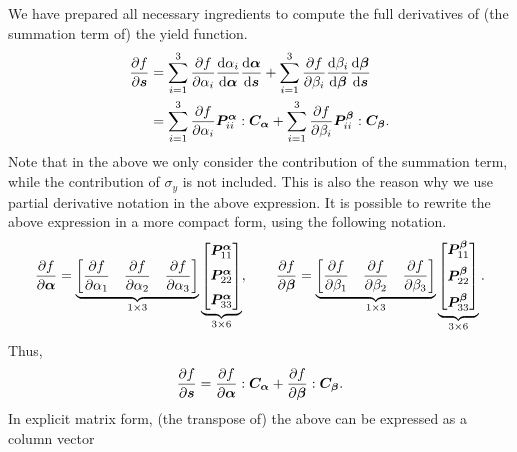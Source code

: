 We have prepared all necessary ingredients to compute the full derivatives of (the summation term of) the yield function.
\begin{gather}
    \begin{split}
        \dfrac{\partial{f}}{\partial{\bm{s}}} & =\sum_{i=1}^{3}\dfrac{\partial{f}}{\partial{\alpha_i}}\dfrac{\mathrm{d}\alpha_i}{\mathrm{d}\bm{\alpha}}\dfrac{\mathrm{d}\bm{\alpha}}{\mathrm{d}\bm{s}}+\sum_{i=1}^{3}\dfrac{\partial{f}}{\partial{\beta_i}}\dfrac{\mathrm{d}\beta_i}{\mathrm{d}\bm{\beta}}\dfrac{\mathrm{d}\bm{\beta}}{\mathrm{d}\bm{s}} \\
                        & =\sum_{i=1}^{3}\dfrac{\partial{f}}{\partial{\alpha_i}}\bm{P}_{ii}^{\bm{\alpha}}:\bm{C}_{\bm{\alpha}}+\sum_{i=1}^{3}\dfrac{\partial{f}}{\partial{\beta_i}}\bm{P}_{ii}^{\bm{\beta}}:\bm{C}_{\bm{\beta}}.
    \end{split}
\end{gather}
Note that in the above we only consider the contribution of the summation term, while the contribution of $\sigma_y$ is not included.
This is also the reason why we use partial derivative notation in the above expression.
It is possible to rewrite the above expression in a more compact form, using the following notation.
\begin{gather}
    \dfrac{\partial{f}}{\partial{\bm{\alpha}}}=\underbrace{\begin{bmatrix}
            \dfrac{\partial{f}}{\partial{\alpha_1}} & \dfrac{\partial{f}}{\partial{\alpha_2}} & \dfrac{\partial{f}}{\partial{\alpha_3}}
        \end{bmatrix}}_{1\times3}\underbrace{\begin{bmatrix}
            \bm{P}_{11}^{\bm{\alpha}} \\[2mm]\bm{P}_{22}^{\bm{\alpha}}\\[2mm]\bm{P}_{33}^{\bm{\alpha}}
        \end{bmatrix}}_{3\times6},\qquad
    \dfrac{\partial{f}}{\partial{\bm{\beta}}}=\underbrace{\begin{bmatrix}
            \dfrac{\partial{f}}{\partial{\beta_1}} & \dfrac{\partial{f}}{\partial{\beta_2}} & \dfrac{\partial{f}}{\partial{\beta_3}}
        \end{bmatrix}}_{1\times3}\underbrace{\begin{bmatrix}
            \bm{P}_{11}^{\bm{\beta}} \\[2mm]\bm{P}_{22}^{\bm{\beta}}\\[2mm]\bm{P}_{33}^{\bm{\beta}}
        \end{bmatrix}}_{3\times6}.
\end{gather}
Thus,
\begin{gather}
    \dfrac{\partial{f}}{\partial{\bm{s}}}=\dfrac{\partial{f}}{\partial{\bm{\alpha}}}:\bm{C}_{\bm{\alpha}}+\dfrac{\partial{f}}{\partial{\bm{\beta}}}:\bm{C}_{\bm{\beta}}.
\end{gather}
In explicit matrix form, (the transpose of) the above can be expressed as a column vector
